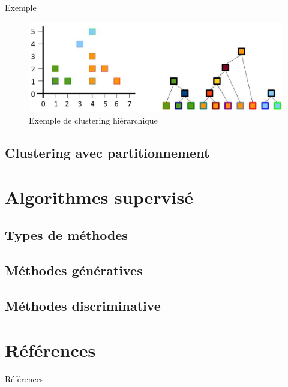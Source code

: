 \documentclass[8pt]{beamer}
\begin{document}
			\begin{frame}{Exemple}
				\begin{figure}[H]
					\includegraphics[width=.8\textwidth]{images/samples/hierchical_clustering.png}
					\caption*{Exemple de clustering hiérarchique}
				\end{figure}
			\end{frame}
		\subsection{Clustering avec partitionnement}

	\section{Algorithmes supervisé}
		\subsection{Types de méthodes}
		\subsection{Méthodes génératives}
		\subsection{Méthodes discriminative}
	\section{Références}
	\begin{frame}[allowframebreaks]{Références}
		\nocite{sklearn_api}
		
		
	\end{frame}
\end{document}
